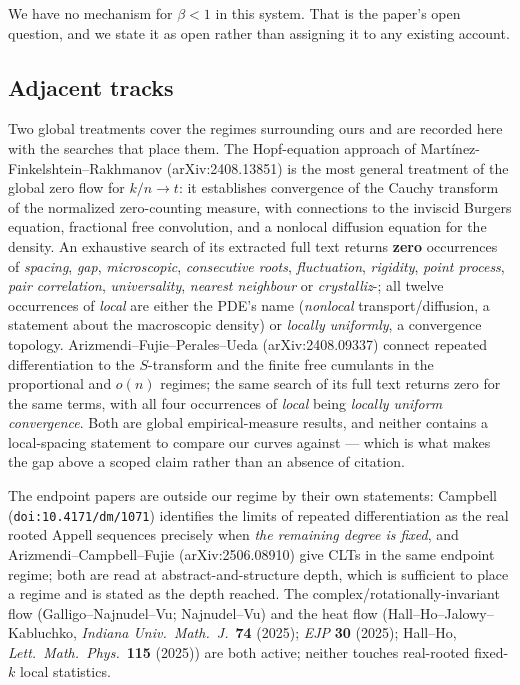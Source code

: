 \documentclass[11pt]{article}
\begin{document}
We have no mechanism for $\beta<1$ in this system. That is the paper's open question, and we
state it as open rather than assigning it to any existing account.

\subsection*{Adjacent tracks}

Two global treatments cover the regimes surrounding ours and are recorded here with the searches
that place them. The Hopf-equation approach of Mart\'inez-Finkelshtein--Rakhmanov
(arXiv:2408.13851) is the most general treatment of the global zero flow for $k/n\to t$: it
establishes convergence of the Cauchy transform of the normalized zero-counting measure, with
connections to the inviscid Burgers equation, fractional free convolution, and a nonlocal
diffusion equation for the density. An exhaustive search of its extracted full text returns
\textbf{zero} occurrences of \emph{spacing}, \emph{gap}, \emph{microscopic}, \emph{consecutive
roots}, \emph{fluctuation}, \emph{rigidity}, \emph{point process}, \emph{pair correlation},
\emph{universality}, \emph{nearest neighbour} or \emph{crystalliz}-; all twelve occurrences of
\emph{local} are either the PDE's name (\emph{nonlocal} transport/diffusion, a statement about
the macroscopic density) or \emph{locally uniformly}, a convergence topology.
Arizmendi--Fujie--Perales--Ueda (arXiv:2408.09337) connect repeated differentiation to the
$S$-transform and the finite free cumulants in the proportional and $o(n)$ regimes; the same
search of its full text returns zero for the same terms, with all four occurrences of
\emph{local} being \emph{locally uniform convergence}. Both are global empirical-measure results,
and neither contains a local-spacing statement to compare our curves against --- which is what
makes the gap above a scoped claim rather than an absence of citation.

The endpoint papers are outside our regime by their own statements: Campbell
(\texttt{doi:10.4171/dm/1071}) identifies the limits of repeated differentiation as the real
rooted Appell sequences precisely when \emph{the remaining degree is fixed}, and
Arizmendi--Campbell--Fujie (arXiv:2506.08910) give CLTs in the same endpoint regime; both are
read at abstract-and-structure depth, which is sufficient to place a regime and is stated as the
depth reached. The complex/rotationally-invariant flow (Galligo--Najnudel--Vu; Najnudel--Vu) and
the heat flow (Hall--Ho--Jalowy--Kabluchko, \emph{Indiana Univ.\ Math.\ J.}\ \textbf{74} (2025);
\emph{EJP} \textbf{30} (2025); Hall--Ho, \emph{Lett.\ Math.\ Phys.}\ \textbf{115} (2025)) are
both active; neither touches real-rooted fixed-$k$ local statistics.
\end{document}
